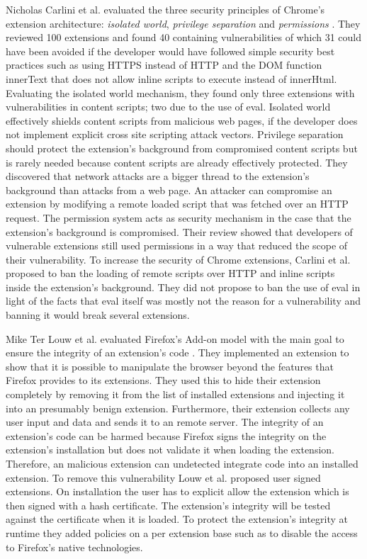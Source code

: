 	Nicholas Carlini et al. evaluated the three security principles of Chrome's extension architecture: \textit{isolated world}, \textit{privilege separation} and \textit{permissions} \cite{Carlini:2012:EGC:2362793.2362800}. They reviewed 100 extensions and found 40 containing vulnerabilities of which 31 could have been avoided if the developer would have followed simple security best practices such as using HTTPS instead of HTTP and the DOM function innerText that does not allow inline scripts to execute instead of innerHtml. Evaluating the isolated world mechanism, they found only three extensions with vulnerabilities in content scripts; two due to the use of eval. Isolated world effectively shields content scripts from malicious web pages, if the developer does not implement explicit cross site scripting attack vectors. Privilege separation should protect the extension's background from compromised content scripts but is rarely needed because content scripts are already effectively protected. They discovered that network attacks are a bigger thread to the extension's background than attacks from a web page. An attacker can compromise an extension by modifying a remote loaded script that was fetched over an HTTP request. The permission system acts as security mechanism in the case that the extension's background is compromised. Their review showed that developers of vulnerable extensions still used permissions in a way that reduced the scope of their vulnerability. To increase the security of Chrome extensions, Carlini et al. proposed to ban the loading of remote scripts over HTTP and inline scripts inside the extension's background. They did not propose to ban the use of eval in light of the facts that eval itself was mostly not the reason for a vulnerability and banning it would break several extensions. 
	
	Mike Ter Louw et al. evaluated Firefox's Add-on model with the main goal to ensure the integrity of an extension's code \cite{TerLouw:2007:EWB:1420581.1420583}. They implemented an extension to show that it is possible to manipulate the browser beyond the features that Firefox provides to its extensions. They used this to hide their extension completely by removing it from the list of installed extensions and injecting it into an presumably benign extension. Furthermore, their extension collects any user input and data and sends it to an remote server. The integrity of an extension's code can be harmed because Firefox signs the integrity on the extension's installation but does not validate it when loading the extension. Therefore, an malicious extension can undetected integrate code into an installed extension. To remove this vulnerability Louw et al. proposed user signed extensions. On installation the user has to explicit allow the extension which is then signed with a hash certificate. The extension's integrity will be tested against the certificate when it is loaded. To protect the extension's integrity at runtime they added policies on a per extension base such as to disable the access to Firefox's native technologies. 
	
